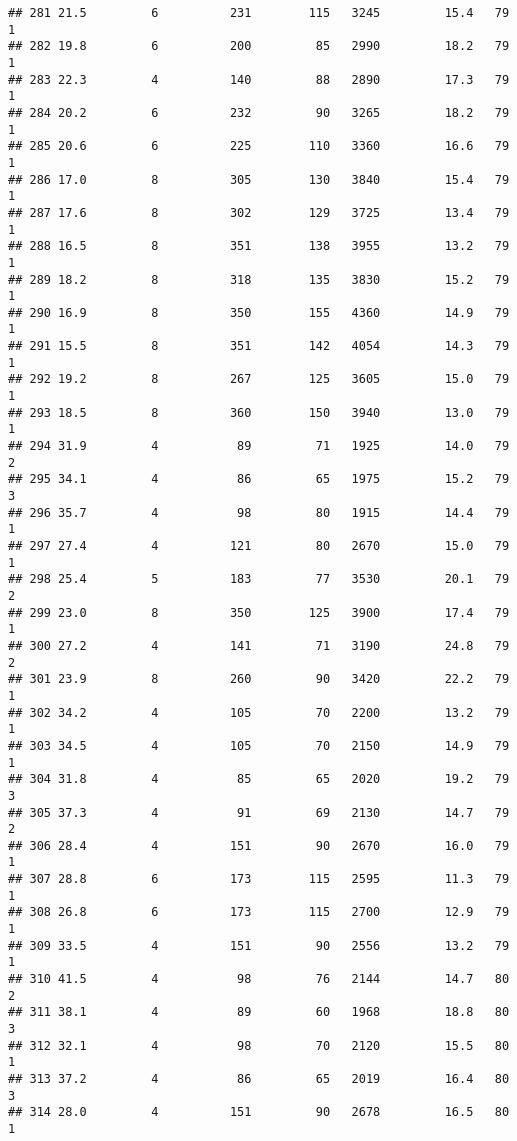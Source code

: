 \documentclass[
]{article}
\begin{document}
\begin{verbatim}
## 281 21.5         6          231        115   3245         15.4   79      1
## 282 19.8         6          200         85   2990         18.2   79      1
## 283 22.3         4          140         88   2890         17.3   79      1
## 284 20.2         6          232         90   3265         18.2   79      1
## 285 20.6         6          225        110   3360         16.6   79      1
## 286 17.0         8          305        130   3840         15.4   79      1
## 287 17.6         8          302        129   3725         13.4   79      1
## 288 16.5         8          351        138   3955         13.2   79      1
## 289 18.2         8          318        135   3830         15.2   79      1
## 290 16.9         8          350        155   4360         14.9   79      1
## 291 15.5         8          351        142   4054         14.3   79      1
## 292 19.2         8          267        125   3605         15.0   79      1
## 293 18.5         8          360        150   3940         13.0   79      1
## 294 31.9         4           89         71   1925         14.0   79      2
## 295 34.1         4           86         65   1975         15.2   79      3
## 296 35.7         4           98         80   1915         14.4   79      1
## 297 27.4         4          121         80   2670         15.0   79      1
## 298 25.4         5          183         77   3530         20.1   79      2
## 299 23.0         8          350        125   3900         17.4   79      1
## 300 27.2         4          141         71   3190         24.8   79      2
## 301 23.9         8          260         90   3420         22.2   79      1
## 302 34.2         4          105         70   2200         13.2   79      1
## 303 34.5         4          105         70   2150         14.9   79      1
## 304 31.8         4           85         65   2020         19.2   79      3
## 305 37.3         4           91         69   2130         14.7   79      2
## 306 28.4         4          151         90   2670         16.0   79      1
## 307 28.8         6          173        115   2595         11.3   79      1
## 308 26.8         6          173        115   2700         12.9   79      1
## 309 33.5         4          151         90   2556         13.2   79      1
## 310 41.5         4           98         76   2144         14.7   80      2
## 311 38.1         4           89         60   1968         18.8   80      3
## 312 32.1         4           98         70   2120         15.5   80      1
## 313 37.2         4           86         65   2019         16.4   80      3
## 314 28.0         4          151         90   2678         16.5   80      1

\end{verbatim}
\end{document}
